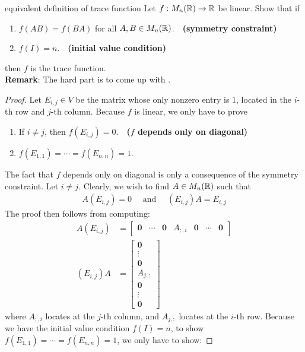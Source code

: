\documentclass{report}
\begin{document}
\begin{question}{equivalent definition of trace function}{}
Let $f:M_n(\mathbb{R})\rightarrow \mathbb{R}$ be linear. Show that if 
\begin{enumerate}[label=(\roman*)]
  \item $f(AB)=f(BA)$ for all $A,B \in M_n(\mathbb{R})$.$\quad $\textbf{(symmetry constraint)} 
  \item $f(I)=n$.$\quad $\textbf{(initial value condition)} 
\end{enumerate}
then $f$ is the trace function. \\

\textbf{Remark}: The hard part is to come up with . 
\end{question}
\begin{proof}
Let $E_{i,j}\in V$ be the matrix whose only nonzero entry is $1$, located in the $i$-th row and $j$-th column. Because $f$ is linear, we only have to prove 
\begin{enumerate}[label=(\roman*)]
  \item If $i\neq j$, then $f(E_{i,j})=0$.$\quad $\textbf{($f$ depends only on diagonal)}
  \item $f(E_{1,1})=\cdots = f(E_{n,n})=1$. 
\end{enumerate}
The fact that $f$ depends only on diagonal is only a consequence of the symmetry constraint. Let $i\neq j$. Clearly, we wish to find $A\in M_n(\mathbb{R})$ such that 
\begin{align}
\label{EQAEij}
A(E_{i,j})=0\quad  \text{ and }\quad (E_{i,j})A= E_{i,j}
\end{align}
The proof then follows from computing: 
\begin{align*}
A(E_{i,j})&= \begin{bmatrix}
  \textbf{0} & \cdots & \textbf{0}& A_{;,i}& \textbf{0} & \cdots & \textbf{0}
\end{bmatrix} \\
  (E_{i,j})A &= \begin{bmatrix}
  \textbf{0} \\
  \vdots \\
  \textbf{0} \\
  A_{j,;}\\
  \textbf{0}\\
  \vdots \\
  \textbf{0}
  \end{bmatrix}
\end{align*}
where $A_{;,i}$ locates at the $j$-th column, and $A_{j,;}$ locates at the $i$-th row.  Because we have the initial value condition $f(I)=n$, to show $f(E_{1,1})=\cdots = f(E_{n,n})=1$, we only have to show: 

\end{proof}
\end{document}
